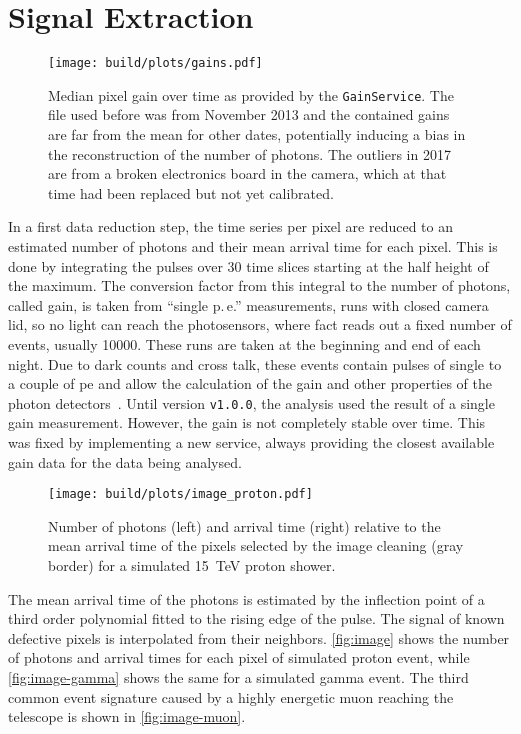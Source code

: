 \section{Signal Extraction}
\begin{figure}
  \centering
  \texttt{[image: build/plots/gains.pdf]}
  \caption{%
    Median pixel gain over time as provided by the \texttt{GainService}.
    The file used before was from November 2013 and the contained gains are far from the mean
    for other dates, potentially inducing a bias in the reconstruction of the number of photons.
    The outliers in 2017 are from a broken electronics board in the camera,
    which at that time had been replaced but not yet calibrated.
  }\label{fig:gains}
\end{figure}
In a first data reduction step, the time series per pixel are reduced to 
an estimated number of photons and their mean arrival time for each pixel.
This is done by integrating the pulses over 30 time slices starting at
the half height of the maximum.
The conversion factor from this integral to the number of photons, called gain,
is taken from \enquote{single p.\,e.} measurements, 
runs with closed camera lid, so no light can reach the photosensors,
where \gls{fact} reads out a fixed number of events, usually \num{10000}.
These runs are taken at the beginning and end of each night.
Due to dark counts and cross talk, these events contain pulses of single to
a couple of \gls{pe} and allow the calculation of the gain and other 
properties of the photon detectors~\cite{fact-sipm-performance}.
Until version \texttt{v1.0.0}, the \facttools{} analysis used the result of a single
gain measurement. 
However, the gain is not completely stable over time.
This was fixed by implementing a new service, always providing the closest available
gain data for the data being analysed.
\begin{figure}
  \centering
  \texttt{[image: build/plots/image\_proton.pdf]}
  \caption{%
    Number of photons (left) and arrival time (right) relative to the mean arrival time
    of the pixels selected by the image cleaning (gray border) for a simulated 
    \SI{15}{\TeV} proton shower.
  }\label{fig:image}
\end{figure}


The mean arrival time of the photons is estimated by the inflection point of a third order polynomial fitted to the rising edge of the pulse.
The signal of known defective pixels is interpolated from their neighbors.
\autoref{fig:image} shows the number of photons and arrival times for each pixel
of simulated proton event, while \autoref{fig:image-gamma} shows the same
for a simulated gamma event.
The third common event signature caused by a highly energetic muon reaching the
telescope is shown in \autoref{fig:image-muon}.

